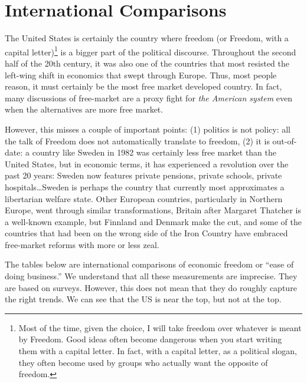 \chapter{International Comparisons}\label{chpt:international}

The United States is certainly the country where freedom (or Freedom, with a
capital letter)\footnote{Most of the time, given the choice, I will take
freedom over whatever is meant by Freedom. Good ideas often become dangerous
when you start writing them with a capital letter. In fact, with a capital
letter, as a political slogan, they often become used by groups who actually
want the opposite of freedom.} is a bigger part of the political discourse.
Throughout the second half of the 20th century, it was also one of the
countries that most resisted the left-wing shift in economics that swept
through Europe. Thus, most people reason, it must certainly be the most free
market developed country. In fact, many discussions of free-market are a proxy
fight for \emph{the American system} even when the alternatives are more free
market.

However, this misses a couple of important points: (1) politics is not policy:
all the talk of Freedom does not automatically translate to freedom, (2) it is
out-of-date: a country like Sweden in 1982 was certainly less free market than
the United States, but in economic terms, it has experienced a revolution over
the past 20 years: Sweden now features private pensions, private schools,
private hospitals\ldots Sweden is perhaps the country that currently most
approximates a libertarian welfare state. Other European countries,
particularly in Northern Europe, went through similar transformations, Britain
after Margaret Thatcher is a well-known example, but Finnland and Denmark make
the cut, and some of the countries that had been on the wrong side of the Iron
Country have embraced free-market reforms with more or less zeal.

The tables below are international comparisons of economic freedom or ``ease of
doing business.'' We understand that all these measurements are imprecise. They
are based on surveys. However, this does not mean that they do roughly capture
the right trends. We can see that the US is near the top, but not at the top.

